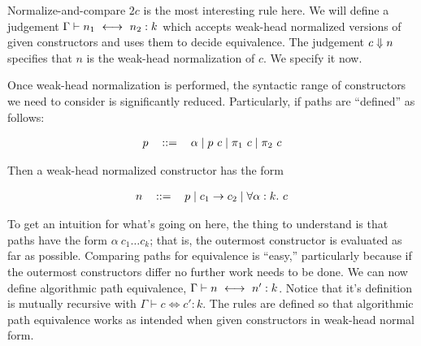\documentclass{amsart}
\begin{document}
\begin{section}{Normalize-and-compare}
    $2c$ is the most interesting rule here. We will define a judgement $\Gamma \vdash n_1 \ \longleftrightarrow\  n_2 : k$ which accepts weak-head normalized versions of given constructors and uses them to decide equivalence. The judgement $c \Downarrow n$ specifies that $n$ is the weak-head normalization of $c$. We specify it now.


    Once weak-head normalization is performed, the syntactic range of constructors we need to consider is significantly reduced. Particularly, if paths are ``defined'' as follows:

        \[
            \begin{tabular}{lcl}
                $p$ & $::=$ & $\alpha \mid p \ c \mid \pi_1 \ c \mid \pi_2 \ c$
            \end{tabular}
        \]

    Then a weak-head normalized constructor has the form

        \[
            \begin{tabular}{lcl}
                $n$ & $::=$ & $p \mid c_1 \to c_2 \mid \forall \alpha : k. \ c$
            \end{tabular}  
        \]

    To get an intuition for what's going on here, the thing to understand is that paths have the form $\alpha \ c_1 \dots c_k$; that is, the outermost constructor is evaluated as far as possible. Comparing paths for equivalence is ``easy,'' particularly because if the outermost constructors differ no further work needs to be done. We can now define algorithmic path equivalence, $\Gamma \vdash n \ \longleftrightarrow\  n' : k$. Notice that it's definition is mutually recursive with $\Gamma \vdash c \iff c' : k$. The rules are defined so that algorithmic path equivalence works as intended when given constructors in weak-head normal form.


\end{section}
\end{document}
